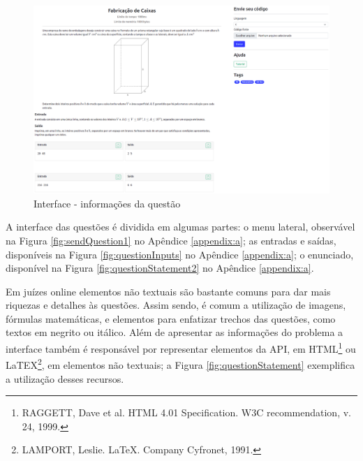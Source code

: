 \begin{figure}[H]
    \centering
    \includegraphics[keepaspectratio=true,scale=0.2]{figuras/question3.eps}
    \caption{Interface - informações da questão}
    \label{fig:question3}
\end{figure}

A interface das questões é dividida em algumas partes: o menu lateral, observável na Figura \ref{fig:sendQuestion1} no Apêndice \ref{appendix:a}; as entradas e saídas, disponíveis na Figura \ref{fig:questionInputs} no Apêndice \ref{appendix:a}; o enunciado, disponível na Figura \ref{fig:questionStatement2} no Apêndice \ref{appendix:a}.

Em juízes online elementos não textuais são bastante comuns para dar mais riquezas e detalhes às questões. Assim sendo, é comum a utilização de imagens, fórmulas matemáticas, e elementos para enfatizar trechos das questões, como textos em negrito ou itálico. Além de apresentar as informações do problema a interface também é responsável por representar elementos da API, em HTML\footnote{RAGGETT, Dave et al. HTML 4.01 Specification. W3C recommendation, v. 24, 1999.}  ou LaTEX\footnote{LAMPORT, Leslie. LaTeX. Company Cyfronet, 1991.}, em elementos não textuais; a Figura \ref{fig:questionStatement} exemplifica a utilização desses recursos.




